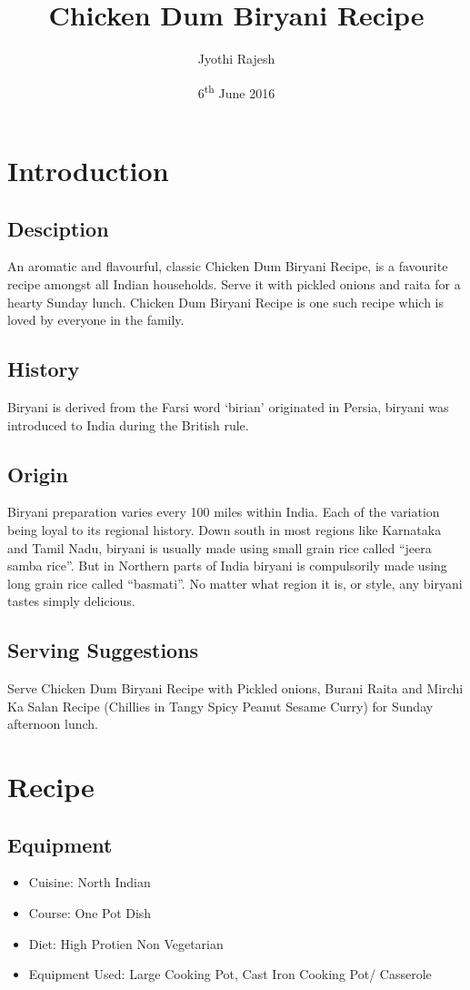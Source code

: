 \documentclass{article}
\author{Jyothi Rajesh}
\title{Chicken Dum Biryani Recipe}
\date{6\textsuperscript{th} June 2016}
\begin{document}
    \maketitle   
    \section{Introduction}
        \subsection{Desciption}
            An aromatic and flavourful, classic Chicken Dum Biryani Recipe, is a favourite recipe amongst all Indian households. Serve it with pickled onions and raita for a hearty Sunday lunch.   
        Chicken Dum Biryani Recipe is one such recipe which is loved by everyone in the family.
        \subsection{History}
            Biryani is derived from the Farsi word ‘birian’ originated in Persia, biryani was introduced to India during the British rule.
        \subsection{Origin}
            Biryani preparation varies every 100 miles within India. Each of the variation being loyal to its regional history. Down south in most regions like Karnataka and Tamil Nadu, biryani is usually made using small grain rice called “jeera samba rice”. But in Northern parts of India biryani is compulsorily made using long grain rice called “basmati”. No matter what region it is, or style, any biryani tastes simply delicious. 
        \subsection{Serving Suggestions}
            Serve Chicken Dum Biryani Recipe with Pickled onions, Burani Raita and Mirchi Ka Salan Recipe (Chillies in Tangy Spicy Peanut Sesame Curry) for Sunday afternoon lunch. 
    \section{Recipe}
        \subsection{Equipment}
            \begin{itemize}
                \item Cuisine:  North Indian
                \item Course:   One Pot Dish
                \item Diet:     High Protien Non Vegetarian
                \item Equipment Used:   	Large Cooking Pot, Cast Iron Cooking Pot/ Casserole
            \end{itemize}
\end{document}
